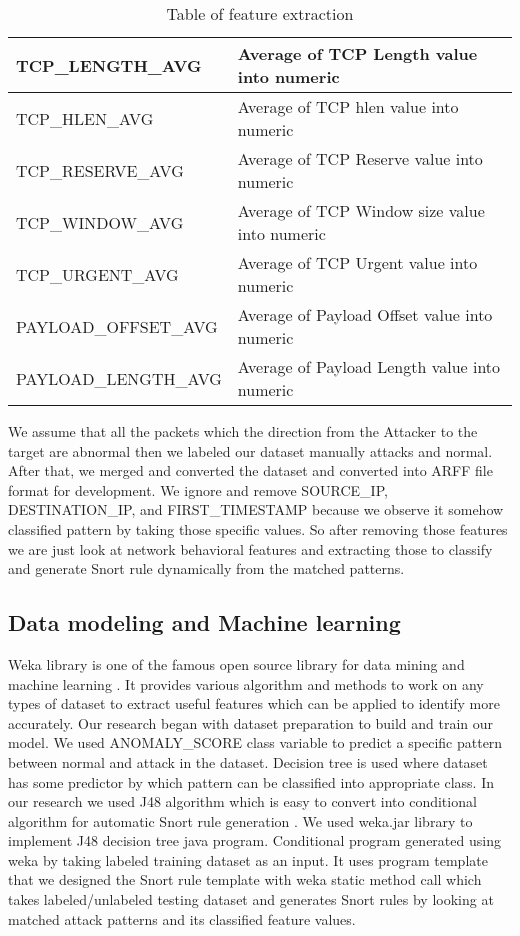 \begin{table}
\begin{center}
\begin{tabular}{|p{3.1cm}|p{4.9cm}|}
\hline
TCP\_LENGTH\_AVG & Average of TCP Length value into numeric\\
\hline
TCP\_HLEN\_AVG & Average of TCP hlen value into numeric\\
\hline
TCP\_RESERVE\_AVG & Average of TCP Reserve value into numeric\\
\hline
TCP\_WINDOW\_AVG & Average of TCP Window size value into numeric\\
\hline
TCP\_URGENT\_AVG & Average of TCP Urgent value into numeric\\
\hline
PAYLOAD\_OFFSET\_AVG & Average of Payload Offset value into numeric\\
\hline
PAYLOAD\_LENGTH\_AVG & Average of Payload Length value into numeric\\
\hline
\end{tabular}
\end{center}
\caption{Table of feature extraction}
\label{table:features}
\end{table}

We assume that all the packets which the direction from the Attacker to the target are abnormal then we labeled our dataset manually attacks and normal. After that, we merged and converted the dataset and 
converted into ARFF file format for development. We ignore and remove SOURCE\_IP, DESTINATION\_IP, and FIRST\_TIMESTAMP because we observe it somehow classified pattern by taking those specific values. So 
after removing those features we are just look at network behavioral features and extracting those to classify and generate Snort rule dynamically from the matched patterns.

\subsection{Data modeling and Machine learning}

Weka library is one of the famous open source library for data mining and machine learning \cite{misc:wekaTutorial}. It provides various algorithm and methods to work on any types of dataset to extract
useful features which can be applied to identify more accurately. Our research began with dataset preparation to build and train our model. We used ANOMALY\_SCORE class variable to predict a specific
pattern between normal and attack in the dataset. Decision tree is used where dataset has some predictor by which pattern can be classified into appropriate class. In our research we used J48 algorithm 
which is easy to convert into conditional algorithm for automatic Snort rule generation \cite{misc:weka.jar}. We used weka.jar library to implement J48 decision tree java program. Conditional program 
generated using weka by taking labeled training dataset as an input. It uses program template that we designed the Snort rule template with weka static method call which takes labeled/unlabeled testing 
dataset and generates Snort rules by looking at matched attack patterns and its classified feature values.

